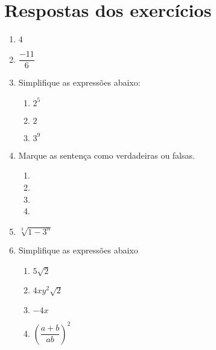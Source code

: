 	
	\section{Respostas dos exercícios}
 
	\begin{enumerate}
		\item $4$
		\item $\dfrac{-11}{6}$    
		\item Simplifique as expressões abaixo:
		\begin{enumerate}
			\item $2^5$
			\item $2$
			\item $3^9$
		\end{enumerate}
		
		\item Marque as sentença como verdadeiras ou falsas.
		\begin{enumerate}
			\item \text{[ F ]}
			\item \text{[ V ]}
			\item \text{[ V ]}
			\item \text{[ F ]}
		\end{enumerate}
		
		\item  $\sqrt[3]{1-3^n}$
		
		\item Simplifique as expressões abaixo 
		\begin{enumerate}
			\item $5\sqrt{2}$
			\item $4xy^2\sqrt{2}$
			\item $-4x$
			\item $ \left(\dfrac{a+b}{ab}\right)^{2}$
		\end{enumerate}
	\end{enumerate}

 